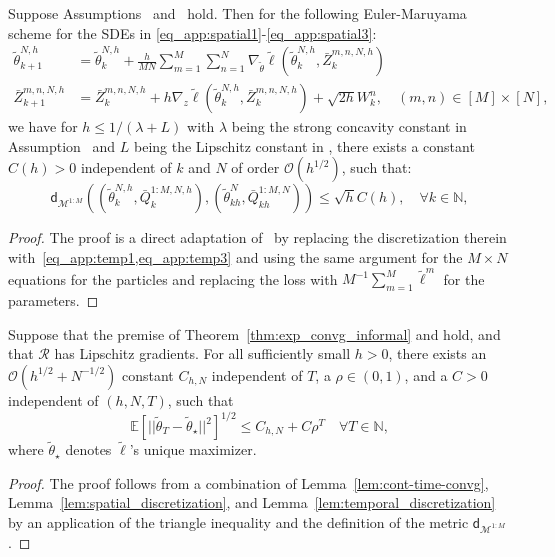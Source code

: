 \begin{lemma}\label{lem:temporal_discretization}
    Suppose Assumptions~ and~ hold. Then for the following Euler-Maruyama scheme for the SDEs in \eqref{eq_app:spatial1}-\eqref{eq_app:spatial3}:
    \begin{align}
        \tilde\theta_{k+1}^{N,h} &= \tilde\theta_k^{N,h} + \frac{h}{MN} \sum_{m=1}^{M}\sum_{n=1}^N \nabla_{\tilde\theta} \tilde{\ell}(\tilde\theta_k^{N,h}, \bar{Z}_k^{m,n,N,h}) \label{eq_app:temp1} \\
        \bar{Z}_{k+1}^{m,n,N,h} &= \bar{Z}_k^{m,n,N,h} + h \nabla_{z} \tilde{\ell}(\tilde\theta_k^{N,h}, \bar{Z}_k^{m,n,N,h}) + \sqrt{2h} W_k^n, \quad (m,n) \in [M] \times [N], \label{eq_app:temp3}
    \end{align}
    we have for $h \leq {1}/({\lambda+L})$ with $\lambda$ being the strong concavity constant in Assumption~ and $L$ being the Lipschitz constant in , there exists a constant $C(h)>0$ independent of $k$ and $N$ of order $\mathcal{O}(h^{1/2})$,
    such that:
    \begin{equation*}
        \mathsf{d}_{\mathcal{M}^{1:M}}((\tilde\theta_k^{N,h}, \bar{Q}_k^{1:M,N,h}), (\tilde\theta_{kh}^N, \bar{Q}_{kh}^{1:M,N})) \leq \sqrt{h}C(h), \quad \forall k \in \mathbb{N},
    \end{equation*}
\end{lemma}
\begin{proof}
    The proof is a direct adaptation of~\citet[Lemma 14]{caprioerrorboundsparticle2024} by replacing the discretization therein with~\cref{eq_app:temp1,eq_app:temp3} and using the same argument for the $M\times N$ equations for the particles and replacing the loss with $M^{-1}\sum_{m=1}^M \tilde{\ell}^m$ for the parameters.
\end{proof}

\begin{theorem}\label{thrm_app:error-bound}
Suppose that the premise of Theorem~\ref{thm:exp_convg_informal} and  hold, and that $\mathcal{R}$ has Lipschitz gradients. For all sufficiently small $h>0$, there exists an $\mathcal{O}(h^{1/2}+N^{-1/2})$ constant $C_{h,N}$ independent of $T$, a $\rho \in (0, 1)$, and a $C>0$ independent of $(h,N,T)$, such that
$$\mathbb{E}\left[\vert\vert\tilde\theta_T-\tilde\theta_\star \vert\vert^2\right]^{1/2} \leq C_{h,N}+C\rho^T\quad\forall T\in \mathbb{N},$$
where $\tilde\theta_\star$ denotes $\tilde{\ell}$'s unique maximizer.
\end{theorem}
\begin{proof}
    The proof follows from a combination of Lemma~\ref{lem:cont-time-convg}, Lemma~\ref{lem:spatial_discretization}, and Lemma~\ref{lem:temporal_discretization} by an application of the triangle inequality and the definition of the metric $\mathsf{d}_{\mathcal{M}^{1:M}}$.
\end{proof}

